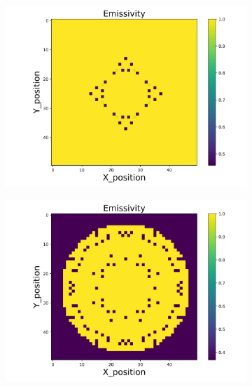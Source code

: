 \begin{figure}[p]
    \centering
    \begin{minipage}{\textwidth}
        \centering
        \begin{subfigure}{0.325\textwidth}
            \centering
            \includegraphics[width=\textwidth]{figures/raw_data/0/exp/emi_cal.jpg}
        \end{subfigure}
        \begin{subfigure}{0.325\textwidth}
            \centering
            \includegraphics[width=\textwidth]{figures/raw_data/5/exp/emi_cal.jpg}
        \end{subfigure}

\end{minipage}
\end{figure}
